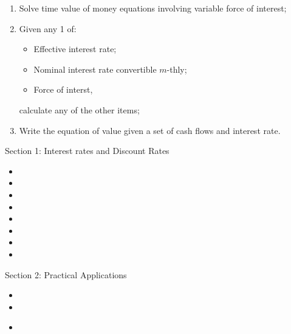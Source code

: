 \begin{outcomes}
\begin{enumerate}[label = \alph*)]
\begin{multicols*}{3}
		\begin{itemize}[leftmargin = *]
		\item	Interest rate;
		\item	Period of time;
		\item	Present value;
		\item	Current value;
		\item	Future value,
		\end{itemize}
		\end{multicols*}
		calculate the remaining item using \textit{simple} or \textit{compound} interest;
	\item[]	Solve time value of money equations involving variable force of interest;
	\item	Given any 1 of:
		\begin{itemize}[leftmargin = *]
		\item	Effective interest rate;
		\item	Nominal interest rate convertible $m$-thly;
		\item	Force of interst,
		\end{itemize}
		calculate any of the other items;
	\item	Write the equation of value given a set of cash flows and interest rate.
\end{enumerate}
\end{outcomes}

\begin{ASM_chapter}
Section 1: Interest rates and Discount Rates
\begin{itemize}
	\item	{}
	\item	{}
	\item	{}
	\item	{}
	\item	{}
	\item	{}
	\item	{}
	\item	{}
\end{itemize}
Section 2: Practical Applications
\begin{itemize}
	\item	{}
	\item	{}
\end{itemize}
\end{ASM_chapter}

\begin{YTB_vids}
\begin{itemize}
	\item	
\end{itemize}
\end{YTB_vids}

